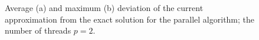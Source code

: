 \documentclass[smallcondensed]{svjour3}     %
\begin{document}
\begin{figure}
\begin{minipage}{0.5\linewidth}
\end{minipage}
\hfill
\begin{minipage}{0.5\linewidth}
\end{minipage}
\caption{Average (a) and maximum (b) deviation of the current approximation from the exact solution for the parallel algorithm; the number of threads $p = 2$.}
\label{fig_last2}
\end{figure}
\end{document}
